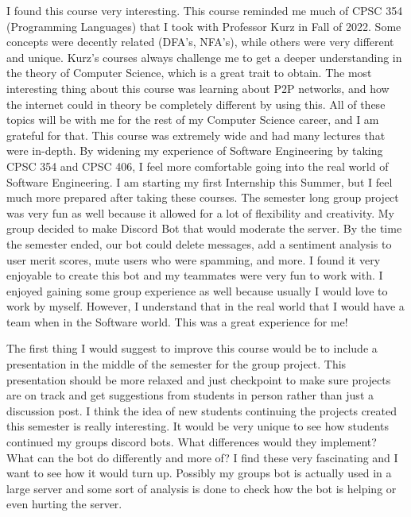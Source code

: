 \documentclass{article}
\theoremstyle{theorem}
\theoremstyle{definition}
\theoremstyle{remark}
\begin{document}
I found this course very interesting. This course reminded me much of CPSC 354 (Programming Languages) that I took with Professor Kurz in Fall of 2022. Some concepts were decently related (DFA's, NFA's), while others were very different and unique. Kurz's courses always challenge me to get a deeper understanding in the theory of Computer Science, which is a great trait to obtain. The most interesting thing about this course was learning about P2P networks, and how the internet could in theory be completely different by using this. All of these topics will be with me for the rest of my Computer Science career, and I am grateful for that. This course was extremely wide and had many lectures that were in-depth. By widening my experience of Software Engineering by taking CPSC 354 and CPSC 406, I feel more comfortable going into the real world of Software Engineering. I am starting my first Internship this Summer, but I feel much more prepared after taking these courses. The semester long group project was very fun as well because it allowed for a lot of flexibility and creativity. My group decided to make Discord Bot that would moderate the server. By the time the semester ended, our bot could delete messages, add a sentiment analysis to user merit scores, mute users who were spamming, and more. I found it very enjoyable to create this bot and my teammates were very fun to work with. I enjoyed gaining some group experience as well because usually I would love to work by myself. However, I understand that in the real world that I would have a team when in the Software world. This was a great experience for me!

The first thing I would suggest to improve this course would be to include a presentation in the middle of the semester for the group project. This presentation should be more relaxed and just checkpoint to make sure projects are on track and get suggestions from students in person rather than just a discussion post. I think the idea of new students continuing the projects created this semester is really interesting. It would be very unique to see how students continued my groups discord bots. What differences would they implement? What can the bot do differently and more of? I find these very fascinating and I want to see how it would turn up. Possibly my groups bot is actually used in a large server and some sort of analysis is done to check how the bot is helping or even hurting the server. 
\end{document}
